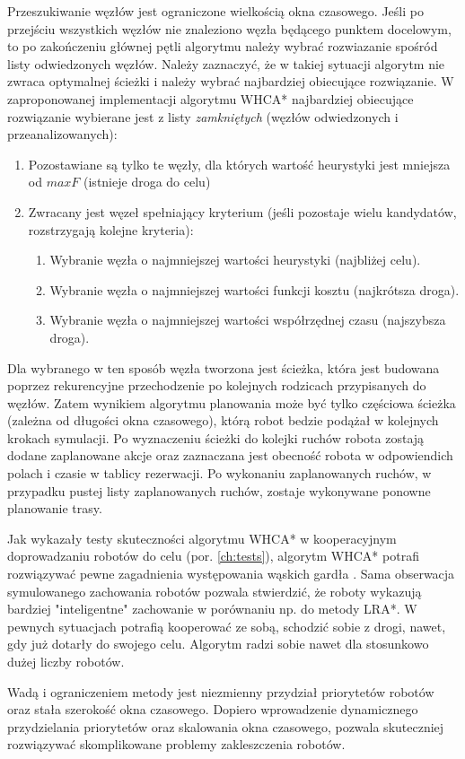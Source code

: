 Przeszukiwanie węzłów jest ograniczone wielkością okna czasowego. Jeśli po przejściu wszystkich węzłów nie znaleziono węzła będącego punktem docelowym, to po zakończeniu głównej pętli algorytmu należy wybrać rozwiazanie spośród listy odwiedzonych węzłów.
Należy zaznaczyć, że w takiej sytuacji algorytm nie zwraca optymalnej ścieżki i należy wybrać najbardziej obiecujące rozwiązanie.
W zaproponowanej implementacji algorytmu WHCA* najbardziej obiecujące rozwiązanie wybierane jest z listy {\it zamkniętych} (węzłów odwiedzonych i przeanalizowanych):
\begin{enumerate}
	\item Pozostawiane są tylko te węzły, dla których wartość heurystyki jest mniejsza od $maxF$ (istnieje droga do celu)
	\item Zwracany jest węzeł spełniający kryterium (jeśli pozostaje wielu kandydatów, rozstrzygają kolejne kryteria):
	\begin{enumerate}
		\item Wybranie węzła o najmniejszej wartości heurystyki (najbliżej celu).
		\item Wybranie węzła o najmniejszej wartości funkcji kosztu (najkrótsza droga).
		\item Wybranie węzła o najmniejszej wartości współrzędnej czasu (najszybsza droga).
	\end{enumerate}
\end{enumerate}

Dla wybranego w ten sposób węzła tworzona jest ścieżka, która jest budowana poprzez rekurencyjne przechodzenie po kolejnych rodzicach przypisanych do węzłów.
Zatem wynikiem algorytmu planowania może być tylko częściowa ścieżka (zależna od długości okna czasowego), którą robot bedzie podążał w kolejnych krokach symulacji. Po wyznaczeniu ścieżki do kolejki ruchów robota zostają dodane zaplanowane akcje oraz zaznaczana jest obecność robota w odpowiendich polach i czasie w tablicy rezerwacji. Po wykonaniu zaplanowanych ruchów, w przypadku pustej listy zaplanowanych ruchów, zostaje wykonywane ponowne planowanie trasy.

Jak wykazały testy skuteczności algorytmu WHCA* w kooperacyjnym doprowadzaniu robotów do celu (por. \ref{ch:tests}), algorytm WHCA* potrafi rozwiązywać pewne zagadnienia występowania wąskich gardła . 
Sama obserwacja symulowanego zachowania robotów pozwala stwierdzić, że roboty wykazują bardziej "inteligentne" zachowanie w porównaniu np. do metody LRA*. W pewnych sytuacjach potrafią kooperować ze sobą, schodzić sobie z drogi, nawet, gdy już dotarły do swojego celu.
Algorytm radzi sobie nawet dla stosunkowo dużej liczby robotów.


Wadą i ograniczeniem metody jest niezmienny przydział priorytetów robotów oraz stała szerokość okna czasowego.
Dopiero wprowadzenie dynamicznego przydzielania priorytetów oraz skalowania okna czasowego, pozwala skuteczniej rozwiązywać skomplikowane problemy zakleszczenia robotów.
